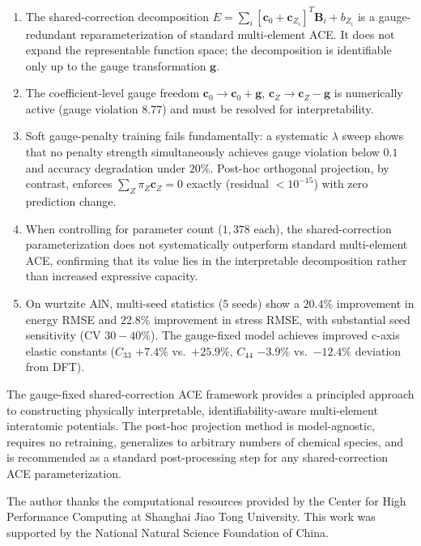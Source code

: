 \documentclass[twoside,prb,aps,floatfix,superscriptaddress,longbibliography]{revtex4-2}
\begin{document}
\begin{enumerate}[label=\textbf{(F\arabic*)}]
    \item The shared-correction decomposition $E = \sum_i [\mathbf{c}_0 + \mathbf{c}_{Z_i}]^T \mathbf{B}_i + b_{Z_i}$ is a gauge-redundant reparameterization of standard multi-element ACE. It does not expand the representable function space; the decomposition is identifiable only up to the gauge transformation $\mathbf{g}$.
    \item The coefficient-level gauge freedom $\mathbf{c}_0 \to \mathbf{c}_0 + \mathbf{g}$, $\mathbf{c}_Z \to \mathbf{c}_Z - \mathbf{g}$ is numerically active (gauge violation $8.77$) and must be resolved for interpretability.
    \item Soft gauge-penalty training fails fundamentally: a systematic $\lambda$ sweep shows that no penalty strength simultaneously achieves gauge violation below $0.1$ and accuracy degradation under $20\%$. Post-hoc orthogonal projection, by contrast, enforces $\sum_Z \pi_Z \mathbf{c}_Z = 0$ exactly (residual $< 10^{-15}$) with zero prediction change.
    \item When controlling for parameter count ($1{,}378$ each), the shared-correction parameterization does not systematically outperform standard multi-element ACE, confirming that its value lies in the interpretable decomposition rather than increased expressive capacity.
    \item On wurtzite AlN, multi-seed statistics ($5$ seeds) show a $20.4\%$ improvement in energy RMSE and $22.8\%$ improvement in stress RMSE, with substantial seed sensitivity (CV $30{-}40\%$). The gauge-fixed model achieves improved c-axis elastic constants ($C_{33}$ $+7.4\%$ vs.\ $+25.9\%$, $C_{44}$ $-3.9\%$ vs.\ $-12.4\%$ deviation from DFT).
\end{enumerate}

The gauge-fixed shared-correction ACE framework provides a principled approach to constructing physically interpretable, identifiability-aware multi-element interatomic potentials. The post-hoc projection method is model-agnostic, requires no retraining, generalizes to arbitrary numbers of chemical species, and is recommended as a standard post-processing step for any shared-correction ACE parameterization.

\begin{acknowledgments}
The author thanks the computational resources provided by the Center for High Performance Computing at Shanghai Jiao Tong University. This work was supported by the National Natural Science Foundation of China.
\end{acknowledgments}
\end{document}

